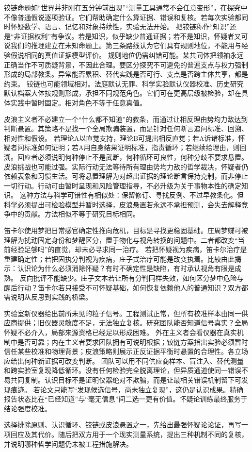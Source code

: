 铰链命题如“世界并非刚在五分钟前出现”“测量工具通常不会任意变形”，在探究中不像普通假说逐项验证。它们帮助确定什么算证据、错误和复核。若每次实验都同时怀疑数学、语言、记忆和对象持续性，实验无法开始\parencite{wittgenstein1969}。 把铰链称作“知识”还是“非证据权利”有争议。若是知识，似乎缺少普通证据；若不是知识，怀疑者又可说我们的推理建立在未知命题上。第三条路线认为它们具有规则地位，不能用与经验假说相同的真值证据模型评价。 规则地位仍需纠错可能。某共同体把领袖永远正确当作不可质疑背景，不因此合理。要区分探究不可避免的普遍支点与权力强制形成的局部教条。异常能否累积、替代实践是否可行、支点是否跨主体共享，都是约束。 铰链也可能领域相对。法庭默认无罪、科学实验默认仪器校准、历史研究默认档案大体按规则形成，承担不同规范角色。它们可在更高层级被检验，却在具体实践中暂时固定。相对角色不等于任意真值。

皮浪主义者不必建立一个“什么都不知道”的教条，而通过让相反理由势均力敌达到判断悬置\parencite{sextus2000}。其策略不是找一个全局欺骗装置，而是针对任何断言追问标准、回溯、相对性和假设。 若理论A以直觉支持，理论B可提出相反直觉；若A诉诸标准，怀疑者问标准如何证明；若A用自身结果证明标准，指责循环；若继续给理由，则回溯。回应者必须说明何种停止不是武断，何种循环可良性，何种分歧不要求悬置。 皮浪挑战也可能过强。实际行动无法等待所有理由势均力敌的哲学裁决，怀疑者仍依赖表象和习惯生活。可将悬置理解为对超出证据的理论断言保持克制，而非停止一切行动。行动可由暂时呈现和风险管理指导，不必升级为关于事物本性的确定知识。 这种方法与科学可错性有相似处：保留修订、寻找反例、不过早教条化。但科学必须提出可检验模型并暂时选择，皮浪悬置若永远不承担预测，会失去解释竞争中的贡献。方法相似不等于研究目标相同。

笛卡尔使用梦把日常感官确定性推向危机，目标是寻找更稳固基础\parencite{descartes1996}。庄周梦蝶可被理解为扰动固定身份和梦醒区分，置于物化与视角转换的问题中\parencite{zhuangzi2009}。二者都改变“当前经验足够吗”的直觉，却未必寻求同一治疗。 若把怀疑视为疾病，笛卡尔治疗是重建确定性；若把固执分判视为疾病，庄子式治疗可能是改变执着。比较由此揭示：认识论为什么必须消除怀疑？有时不确定性是缺陷，有时承认视角有限是成熟。 反向批评不能缺少。庄子文本若让所有分判同样失效，如何区分梦中危险与醒后行动？笛卡尔若只接受不可怀疑基础，如何恢复依赖他人的普通知识？双方都需说明从反思到实践的桥梁。

实验室新仪器给出前所未见的粒子信号。工程测试正常，但所有校准样本由同一供应商提供；旧仪器灵敏度不足，无法独立复核。研究团队能否知道信号真实？全局怀疑不必介入，局部来源资格已经足以形成困难。 外在主义者会看仪器在真实机制中是否可靠；内在主义者要求团队拥有可说明根据；铰链方案指出实验必须暂时信任某些校准和物理背景；皮浪策略则展示正反证据平衡时悬置的合理性。各立场应给出何种新证据可改变判断。 团队可以用不同供应商样本、盲注入、替代测量和跨实验室复现降低循环。没有任何检验完全脱离理论，但异质通道使同一错误不易共同复制。认识目标不是证明仪器绝对不欺骗，而是让最相关错误机制留下可发现痕迹。 若论文只能写“发现候选信号，尚未独立复现”，这仍是认识成果。精确报告状态比在“已经知道”与“毫无信息”间二选一更有价值。怀疑论训练最终服务于结论强度校准。

\begin{tcolorbox}[breakable,colback=white,colframe=blue!30!black,title={专题研讨任务},fonttitle=\bfseries]
选择排除原则、认识循环、铰链或皮浪悬置之一，先给出最强怀疑论论证，再写一项回应及其代价。随后把双方用于一个现实测量系统，提出三种机制不同的复核，并说明哪种哲学问题仍未被工程措施解决。
\end{tcolorbox}
